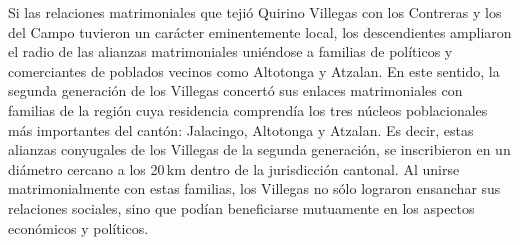 \documentclass[14pt,twoside,final]{extbook} %
\begin{document}
Si las relaciones matrimoniales que tejió Quirino Villegas con los Contreras y los del Campo tuvieron un carácter eminentemente local, los descendientes ampliaron el radio de las alianzas matrimoniales uniéndose a familias de políticos y comerciantes de poblados vecinos como Altotonga y Atzalan. En este sentido, la segunda generación de los Villegas concertó sus enlaces matrimoniales con familias de la región cuya residencia comprendía los tres núcleos poblacionales más importantes del cantón: Jalacingo, Altotonga y Atzalan. Es decir, estas alianzas conyugales de los Villegas de la segunda generación, se inscribieron en un diámetro cercano a los 20\,km dentro de la jurisdicción cantonal. Al unirse matrimonialmente con estas familias, los Villegas no sólo lograron ensanchar sus relaciones sociales, sino que podían beneficiarse mutuamente en los aspectos económicos y políticos.
\end{document}
